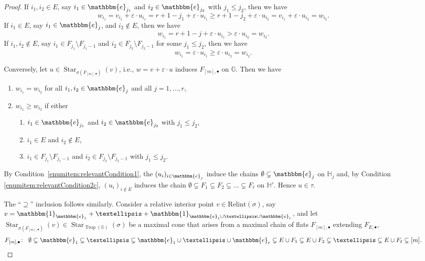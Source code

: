 \documentclass[10pt,a4paper]{amsart}
\DeclareMathOperator{\Star}{Star}
\DeclareMathOperator{\Trop}{Trop}
\newcommand{\GG}{\mathbb{G}}
\newcommand{\HH}{\mathbb{H}}
\newcommand{\bbone}{\mathbbm{1}}
\newcommand{\ee}{\mathbbm{e}}
\begin{document}
\begin{proof}
  \noindent
  If $i_1,i_2\in E$, say $i_1\in \ee_{j_1}$ and $i_2\in \ee_{j_2}$ with $j_1\leq j_2$, then we have
  \begin{equation*}
    w_{i_1}=v_{i_1}+ \varepsilon\cdot u_{i_1} = r+1-j_1+ \varepsilon\cdot u_{i_1} \geq r+1-j_2 + \varepsilon\cdot u_{i_2}= v_{i_1}+\varepsilon\cdot u_{i_2}=w_{i_2}.
  \end{equation*}
  If $i_1\in E$, say $i_1\in\ee_j$, and $i_2\notin E$, then we have
  \begin{equation*}
    w_{i_1}=r+1-j + \varepsilon\cdot u_{i_1} > \varepsilon\cdot u_{i_2} = w_{i_2}.
  \end{equation*}
  If $i_1,i_2\notin E$, say $i_1\in F_{j_1} \setminus F_{j_1-1}$ and $i_2\in F_{j_2} \setminus F_{j_2-1}$ for some $j_1\leq j_2$, then we have
  \begin{equation*}
    w_{i_1}=\varepsilon\cdot u_{i_1} \geq \varepsilon\cdot u_{i_2}=w_{i_2}.
  \end{equation*}

  Conversely, let $u\in\Star_{\sigma(F_{[m],\bullet})}(v)$, i.e., $w=v+\varepsilon\cdot u$ induces $F_{[m],\bullet}$ on $\GG$.  Then we have
  \begin{enumerate}
  \item \label{enumitem:relevantCondition1}$w_{i_1}=w_{i_2}$ for all $i_1,i_2\in \ee_j$ and all $j=1,\dots,r$,
  \item $w_{i_1}\geq w_{i_2}$ if either
    \begin{enumerate}
    \item $i_1\in \ee_{j_1}$ and $i_2\in\ee_{j_2}$ with $j_1\leq j_2$,
    \item $i_1\in E$ and $i_2\notin E$,
    \item \label{enumitem:relevantCondition2c} $i_1\in F_{j_1}\setminus F_{j_1-1}$ and $i_2\in F_{j_2}\setminus F_{j_2-1}$ with $j_1\leq j_2$.
    \end{enumerate}
  \end{enumerate}
  By Condition~\eqref{enumitem:relevantCondition1}, the $(u_i)_{i\in\ee_j}$ induce the chains $\emptyset\subsetneq \ee_j$ on $\HH_j$ and, by Condition \eqref{enumitem:relevantCondition2c}, $(u_i)_{i\notin E}$ induces the chain $\emptyset \subsetneq F_1 \subsetneq F_2\subsetneq \dots\subsetneq F_\ell$ on $\HH'$.  Hence $u\in\tau$.

  The ``$\supseteq$'' inclusion follows similarly.  Consider a relative interior point $v\in\mathrm{Relint}(\sigma)$, say $v = \bbone_{\ee_1}+\dots+\bbone_{\ee_1\cup\dots\cup\ee_r}$, and let $\Star_{\sigma(F_{[m],\bullet})}(v)\in \Star_{\Trop(\GG)}(\sigma)$ be a maximal cone that arises from a maximal chain of flats $F_{[m],\bullet}$ extending $F_{E,\bullet}$,
  \begin{equation*}
    F_{[m],\bullet}\colon\;\; \emptyset\subsetneq \ee_1\subsetneq \dots\subsetneq \ee_1\cup\dots\cup\ee_r\subsetneq E\cup F_1\subsetneq E\cup F_2\subsetneq\dots\subsetneq E\cup F_\ell\subsetneq [m].
  \end{equation*}


\end{proof}
\end{document}
